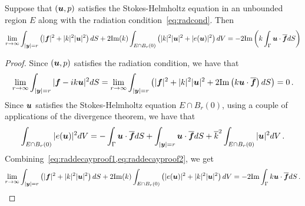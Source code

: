 \begin{lem}
\label{lem:rep}
Suppose that $({\boldsymbol u},p)$ satisfies the Stokes-Helmholtz equation in 
an unbounded region $E$ along with the radiation 
condition~\cref{eq:radcond}. 
Then 
\begin{equation}
\label{eq:repinfest}
\lim_{r\to\infty}
\int_{|{\boldsymbol y}|=r} \left( |{\boldsymbol f}|^2 + |k|^2 |{\boldsymbol u}|^2 \right) dS +
2 {\textrm{\textup{Im}}}(k) \int_{E \cap B_{r}(0)} \left(|k|^2 |{\boldsymbol u}|^2 + |e({\boldsymbol u})|^2 \right)
dV = -2 {\textrm{\textup{Im}}} \left( k \int_{\Gamma} {\boldsymbol u} \cdot \overline{{\boldsymbol f}} dS  \right)
\end{equation}
\end{lem}

\begin{proof}
Since $({\boldsymbol u},p)$ satisfies the radiation condition, we have that
\begin{equation}
\lim_{r\to\infty} \int_{|{\boldsymbol y}|=r} | {\boldsymbol f} - i k {\boldsymbol u}|^2 dS = 
\lim_{r\to\infty} \int_{|{\boldsymbol y}| =r} \left( |{\boldsymbol f}|^2 + |k|^2|{\boldsymbol u}|^2 + 2 {\textrm{\textup{Im}}} 
\left( k {\boldsymbol u}\cdot \overline{{\boldsymbol f}} \right) dS \label{eq:raddecayproof1}
\right) = 0 \, . 
\end{equation}
Since ${\boldsymbol u}$ satisfies the Stokes-Helmholtz equation $E \cap B_{r}(0)$,
using a couple of applications of the divergence theorem, we have that
\begin{equation}
\int_{E\cap B_{r}(0)} |e({\boldsymbol u})|^2 dV = -\int_{\Gamma} {\boldsymbol u} \cdot \overline{{\boldsymbol f}} dS
+ \int_{|{\boldsymbol y}|=r} {\boldsymbol u} \cdot \overline{{\boldsymbol f}} dS + \overline{k}^2 
\int_{E \cap B_{r}(0)} |{\boldsymbol u}|^2 dV \,. \label{eq:raddecayproof2}
\end{equation}
Combining~\cref{eq:raddecayproof1,eq:raddecayproof2}, we get
\begin{equation}
\lim_{r\to\infty} \int_{|{\boldsymbol y}|=r}\left(|{\boldsymbol f}|^2 + |k|^2 |{\boldsymbol u}|^2 \right) dS 
+ 2{\textrm{\textup{Im}}}(k)\int_{E \cap B_{r}(0)} \left(|e({\boldsymbol u})|^2 + |k|^2 |{\boldsymbol u}|^2 
\right) dV = -2{\textrm{\textup{Im}}} \int_{\Gamma} k {\boldsymbol u} \cdot \overline{{\boldsymbol f}} dS \, .
\end{equation}
\end{proof}

